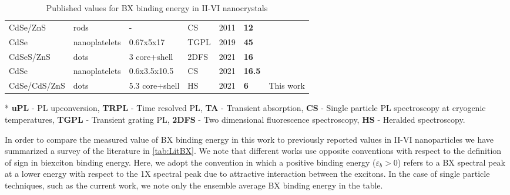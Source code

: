 \documentclass[journal=nalefd, manuscript=letter, layout=twocolumn]{achemso}
\begin{document}
\begin{table*}[h]
\begin{tabular}{M{3.4cm} M{2cm} M{3cm} M{2cm} M{1cm} M{2.25cm} M{0.75cm}}
         CdSe/ZnS &rods &- &CS &2011 &\textbf{12} & \\
         
         CdSe &nanoplatelets &0.67x5x17 &TGPL &2019 &\textbf{45} & \\
         
         CdSeS/ZnS &dots &3 core+shell &2DFS &2021 &\textbf{16} & \\
         
         CdSe &nanoplatelets & 0.6x3.5x10.5 &CS &2021 &\textbf{16.5} &\\
         \midrule
         CdSe/CdS/ZnS &dots &5.3 core+shell &HS &2021 &\textbf{6} & This work\\         
         \bottomrule
    \end{tabular}
    \caption{Published values for BX binding energy in II-VI nanocrystals}
    \label{tab:LitBX}
    \footnotesize{* \textbf{uPL} - PL upconversion, \textbf{TRPL} - Time resolved PL, \textbf{TA} - Transient absorption, \textbf{CS} - Single particle PL spectroscopy at cryogenic temperatures, \textbf{TGPL} - Transient grating PL, \textbf{2DFS} - Two dimensional fluorescence spectroscopy, \textbf{HS} - Heralded spectroscopy.\vspace{110pt}}
\end{table*}

In order to compare the measured value of BX binding energy in this work to previously reported values in II-VI nanoparticles we have summarized a survey of the literature in \autoref{tab:LitBX}. We note that different works use opposite conventions with respect to the definition of sign in biexciton binding energy. Here, we adopt the convention in which a positive binding energy ($\varepsilon_b>0$) refers to a BX spectral peak at a lower energy with respect to the 1X spectral peak due to attractive interaction between the excitons. In the case of single particle techniques, such as the current work, we note only the ensemble average BX binding energy in the table.

\cleardoublepage

\end{document}
